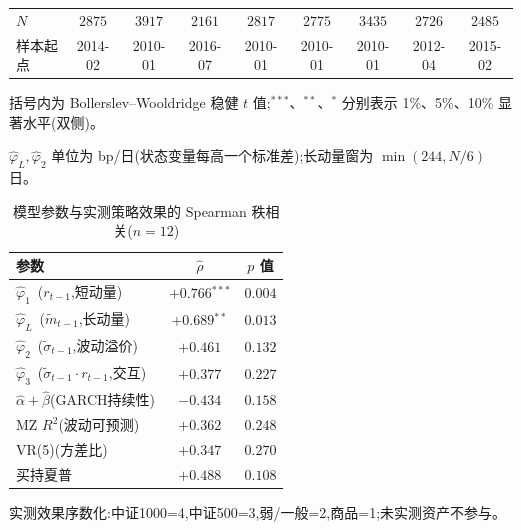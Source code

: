 \begin{table}[htbp]
\begin{threeparttable}
\begin{tabular}{lcccccccc}
$N$ & $2875$ & $3917$ & $2161$ & $2817$ & $2775$ & $3435$ & $2726$ & $2485$ \\
样本起点 & \scriptsize 2014-02 & \scriptsize 2010-01 & \scriptsize 2016-07 & \scriptsize 2010-01 & \scriptsize 2010-01 & \scriptsize 2010-01 & \scriptsize 2012-04 & \scriptsize 2015-02 \\
\bottomrule
\end{tabular}
\begin{tablenotes}\scriptsize
\item 括号内为 Bollerslev--Wooldridge 稳健 $t$ 值;$^{***}$、$^{**}$、$^{*}$ 分别表示 1\%、5\%、10\% 显著水平(双侧)。
\item $\hat\varphi_L,\hat\varphi_2$ 单位为 bp/日(状态变量每高一个标准差);长动量窗为 $\min(244,N/6)$ 日。
\end{tablenotes}\end{threeparttable}\end{table}

\begin{table}[htbp]\centering
\caption{模型参数与实测策略效果的 Spearman 秩相关($n=12$)}\label{tab:rank}
\small\begin{threeparttable}\begin{tabular}{lcc}\toprule
参数 & $\hat\rho$ & $p$ 值 \\ \midrule
$\hat\varphi_1$~($r_{t-1}$,短动量) & $+0.766$$^{***}$ & $0.004$ \\
$\hat\varphi_L$~($\tilde m_{t-1}$,长动量) & $+0.689$$^{**}$ & $0.013$ \\
$\hat\varphi_2$~($\tilde\sigma_{t-1}$,波动溢价) & $+0.461$ & $0.132$ \\
$\hat\varphi_3$~($\tilde\sigma_{t-1}\!\cdot\! r_{t-1}$,交互) & $+0.377$ & $0.227$ \\
$\hat\alpha+\hat\beta$(GARCH持续性) & $-0.434$ & $0.158$ \\
MZ $R^2$(波动可预测) & $+0.362$ & $0.248$ \\
VR(5)(方差比) & $+0.347$ & $0.270$ \\
买持夏普 & $+0.488$ & $0.108$ \\
\bottomrule\end{tabular}
\begin{tablenotes}\scriptsize\item 实测效果序数化:中证1000=4,中证500=3,弱/一般=2,商品=1;未实测资产不参与。
\end{tablenotes}\end{threeparttable}\end{table}
